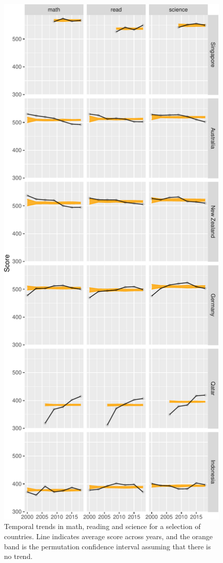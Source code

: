 \begin{Schunk}
\begin{figure}[H]
\includegraphics[width=0.7\linewidth]{learningtower_files/figure-latex/bs-plot-1} \caption[Temporal trends in math, reading and science for a selection of countries]{Temporal trends in math, reading and science for a selection of countries. Line indicates average score across years, and the orange band is the permutation confidence interval assuming that there is no trend. }\label{fig:bs-plot}
\end{figure}
\end{Schunk}

